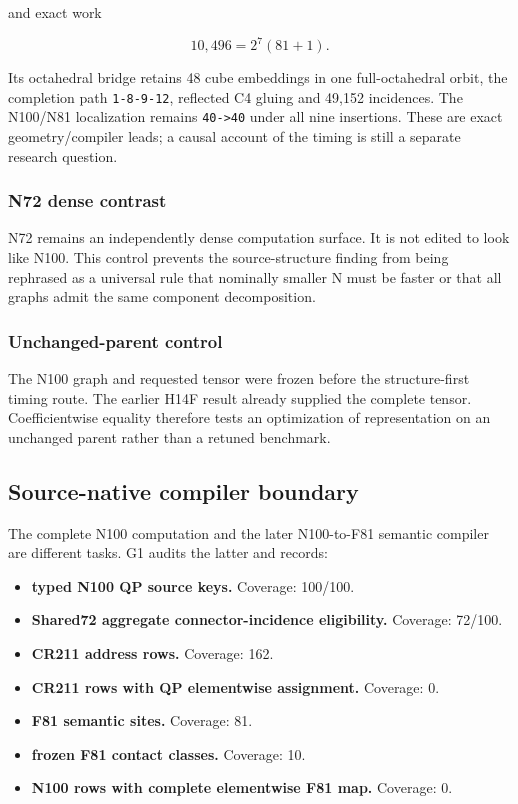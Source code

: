 and exact work

\[
10{,}496=2^7(81+1).
\]

Its octahedral bridge retains 48 cube embeddings in one full-octahedral
orbit, the completion path \texttt{1-8-9-12}, reflected C4 gluing and
49,152 incidences. The N100/N81 localization remains
\texttt{40-\textgreater{}40} under all nine insertions. These are exact
geometry/compiler leads; a causal account of the timing is still a
separate research question.

\subsubsection{N72 dense contrast}\label{viii-ch01-n72-dense-contrast}

N72 remains an independently dense computation surface. It is not edited
to look like N100. This control prevents the source-structure finding
from being rephrased as a universal rule that nominally smaller N must
be faster or that all graphs admit the same component decomposition.

\subsubsection{Unchanged-parent control}\label{viii-ch01-unchanged-parent-control}

The N100 graph and requested tensor were frozen before the
structure-first timing route. The earlier H14F result already supplied
the complete tensor. Coefficientwise equality therefore tests an
optimization of representation on an unchanged parent rather than a
retuned benchmark.

\subsection{Source-native compiler
boundary}\label{viii-ch01-source-native-compiler-boundary}

The complete N100 computation and the later N100-to-F81 semantic
compiler are different tasks. G1 audits the latter and records:

\begin{itemize}
\tightlist
\item
  \textbf{typed N100 QP source keys.} Coverage: 100/100.
\item
  \textbf{Shared72 aggregate connector-incidence eligibility.} Coverage:
  72/100.
\item
  \textbf{CR211 address rows.} Coverage: 162.
\item
  \textbf{CR211 rows with QP elementwise assignment.} Coverage: 0.
\item
  \textbf{F81 semantic sites.} Coverage: 81.
\item
  \textbf{frozen F81 contact classes.} Coverage: 10.
\item
  \textbf{N100 rows with complete elementwise F81 map.} Coverage: 0.
\end{itemize}


